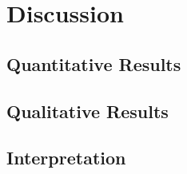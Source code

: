 
\chapter{Discussion} %
\label{Chapter5}

\section{Quantitative Results}

\section{Qualitative Results}

\section{Interpretation}
